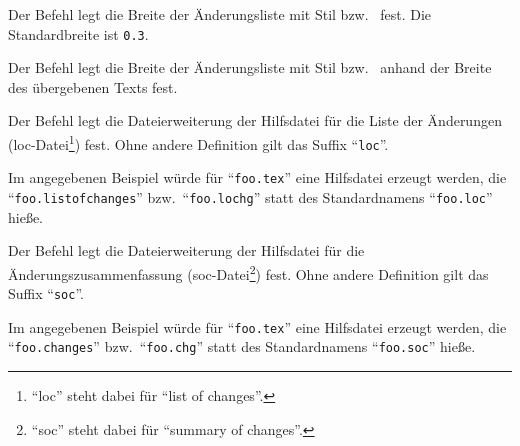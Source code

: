 
Der Befehl  legt die Breite der Änderungsliste mit Stil  bzw.\  fest.
Die Standardbreite ist \texttt{0.3}.






Der Befehl  legt die Breite der Änderungsliste mit Stil  bzw.\  anhand der Breite des übergebenen Texts fest.






Der Befehl  legt die Dateierweiterung der Hilfsdatei für die Liste der Änderungen (loc-Datei\footnote{%
	"`loc"' steht dabei für "`list of changes"'.
}) fest.
Ohne andere Definition gilt das Suffix "`\texttt{loc}"'.

Im angegebenen Beispiel würde für "`\texttt{foo.tex}"' eine Hilfsdatei erzeugt werden, die "`\texttt{foo.listofchanges}"' bzw.\ "`\texttt{foo.lochg}"' statt des Standardnamens "`\texttt{foo.loc}"' hieße.







Der Befehl  legt die Dateierweiterung der Hilfsdatei für die Änderungszusammenfassung (soc-Datei\footnote{%
	"`soc"' steht dabei für "`summary of changes"'.
}) fest.
Ohne andere Definition gilt das Suffix "`\texttt{soc}"'.

Im angegebenen Beispiel würde für "`\texttt{foo.tex}"' eine Hilfsdatei erzeugt werden, die "`\texttt{foo.changes}"' bzw.\ "`\texttt{foo.chg}"' statt des Standardnamens "`\texttt{foo.soc}"' hieße.


